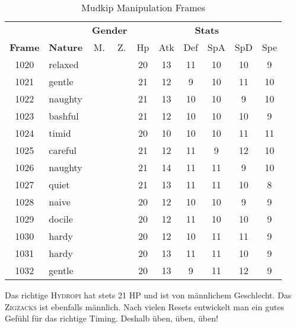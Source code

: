 \documentclass[11pt,a4paper,titlepage]{article}
\begin{document}
\begin{table}[htb]
	\caption{Mudkip Manipulation Frames}
	\label{tab:mudkip_frames}
	\centering
	\begin{tabular}{clcccccccc}
		\toprule
		& & \multicolumn{2}{c}{\textbf{Gender}}	& \multicolumn{6}{c}{\textbf{Stats}}					\\
		\cmidrule(rl){3-4}\cmidrule(ll){5-10}
	\textbf{Frame} 	&\textbf{Nature}	&M. 		&Z.	&Hp		&Atk 	&Def 	&SpA		&SpD		&Spe		\\
		\midrule
			1020 	&relaxed	&\female&\female 	&20		&13		&11		&10		&10		&9		\\
			1021 	&gentle		&\male 	&\male 		&21		&12		&9		&10		&11		&10		\\
			1022 	&naughty	&\male	&\male		&21 	&13		&10		&10		&9		&10		\\
			1023 	&bashful	&\female&\male	  	&21		&12		&10		&10		&10		&9		\\
			1024 	&timid		&\male	&\male		&20		&10		&10		&10		&11		&11		\\
			1025 	&careful	&\male 	&\male 		&21		&12		&11		&9		&12		&10		\\
		\rowcolor{Gray}
			1026 	&naughty	&\male 	&\male 		&21		&14		&11		&11		&9		&10		\\
			1027 	&quiet		&\male 	&\female 	&21		&13		&11		&11		&10		&8		\\
			1028 	&naive		&\male	&\female	&20		&12		&10		&10		&9		&9		\\
			1029 	&docile		&\male	&\male		&20		&12		&11		&10		&10		&9		\\
			1030 	&hardy		&\male 	&\male 		&20		&12		&10		&11		&11		&9		\\
			1031 	&hardy		&\male 	&\male 		&20		&13		&11		&11		&10		&9		\\
			1032 	&gentle		&\male 	&\female 	&20		&13		&9		&11		&12		&9		\\
		\bottomrule
	\end{tabular}
\end{table}

Das richtige \textsc{Hydropi} hat stets 21 HP und ist von männlichem Geschlecht. Das \textsc{Zigzacks} ist ebenfalls männlich. Nach vielen Resets entwickelt man ein gutes Gefühl für das richtige Timing. Deshalb üben, üben, üben!

\end{document}
